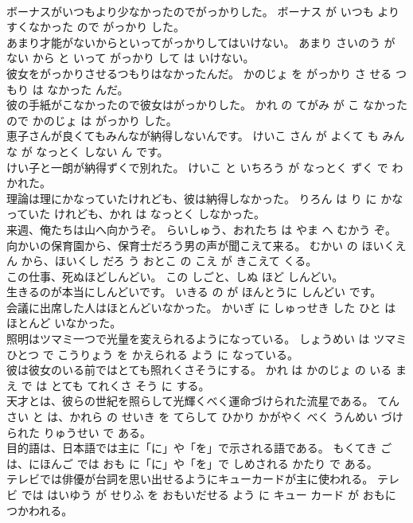 \documentclass[8pt]{extreport}
\begin{document}
\begin{CJK}{UTF8}{min}
\\	ボーナスがいつもより少なかったのでがっかりした。	ボーナス が いつも より すくなかった ので がっかり した。	
\\	あまり才能がないからといってがっかりしてはいけない。	あまり さいのう が ない から と いって がっかり して は いけない。	
\\	彼女をがっかりさせるつもりはなかったんだ。	かのじょ を がっかり さ せる つもり は なかった んだ。	
\\	彼の手紙がこなかったので彼女はがっかりした。	かれ の てがみ が こ なかった ので かのじょ は がっかり した。	
\\	恵子さんが良くてもみんなが納得しないんです。	けいこ さん が よくて も みんな が なっとく しない ん です。	
\\	けい子と一朗が納得ずくで別れた。	けいこ と いちろう が なっとく ずく で わかれた。	
\\	理論は理にかなっていたけれども、彼は納得しなかった。	りろん は り に かなっていた けれども、かれ は なっとく しなかった。	
\\	来週、俺たちは山へ向かうぞ。	らいしゅう、おれたち は やま へ むかう ぞ。	
\\	向かいの保育園から、保育士だろう男の声が聞こえて来る。	むかい の ほいくえん から、ほいくし だろ う おとこ の こえ が きこえて くる。	
\\	この仕事、死ぬほどしんどい。	この しごと、しぬ ほど しんどい。	
\\	生きるのが本当にしんどいです。	いきる の が ほんとうに しんどい です。	
\\	会議に出席した人はほとんどいなかった。	かいぎ に しゅっせき した ひと は ほとんど いなかった。	
\\	照明はツマミ一つで光量を変えられるようになっている。	しょうめい は ツマミ ひとつ で こうりょう を かえられる よう に なっている。	
\\	彼は彼女のいる前ではとても照れくさそうにする。	かれ は かのじょ の いる まえ で は とても てれくさ そう に する。	
\\	天才とは、彼らの世紀を照らして光輝くべく運命づけられた流星である。	てんさい と は、かれら の せいき を てらして ひかり かがやく べく うんめい づけられた りゅうせい で ある。	
\\	目的語は、日本語では主に「に」や「を」で示される語である。	もくてき ご は、にほんご では おも に「に」や「を」で しめされる かたり で ある。	
\\	テレビでは俳優が台詞を思い出せるようにキューカードが主に使われる。	テレビ では はいゆう が せりふ を おもいだせる よう に キュー カード が おもに つかわれる。	

\end{CJK}
\end{document}
